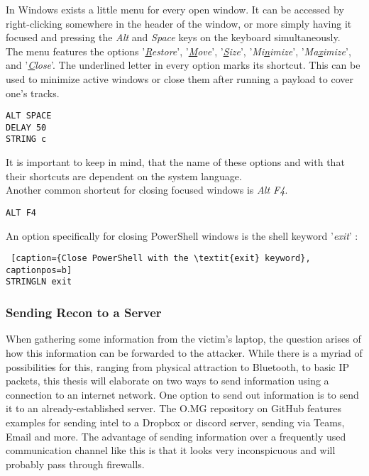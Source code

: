 In Windows exists a little menu for every open window. It can be accessed by right-clicking somewhere in the header of the window, or more simply having it focused and pressing the \textit{Alt} and \textit{Space} keys on the keyboard simultaneously. \\
The menu features the options '\textit{\underline{R}estore}', '\textit{\underline{M}ove}', '\textit{\underline{S}ize}', '\textit{Mi\underline{n}imize}', '\textit{Ma\underline{x}imize}', and '\textit{\underline{C}lose}'. The underlined letter in every option marks its shortcut. This can be used to minimize active windows or close them after running a payload to cover one's tracks.
\begin{lstlisting}[caption={Close a window through its window menu}, captionpos=b]
ALT SPACE
DELAY 50
STRING c
\end{lstlisting}
It is important to keep in mind, that the name of these options and with that their shortcuts are dependent on the system language. \\
Another common shortcut for closing focused windows is \textit{Alt F4}.
\begin{lstlisting}[caption={Close a window with ALT F4}, captionpos=b]
ALT F4
\end{lstlisting}


An option specifically for closing PowerShell windows is the shell keyword '\textit{exit}' :
\begin{lstlisting} [caption={Close PowerShell with the \textit{exit} keyword}, captionpos=b]
STRINGLN exit
\end{lstlisting}


\subsubsection{Sending Recon to a Server}

When gathering some information from the victim's laptop, the question arises of how this information can be forwarded to the attacker. While there is a myriad of possibilities for this, ranging from physical attraction to Bluetooth, to basic IP packets, this thesis will elaborate on two ways to send information using a connection to an internet network.
One option to send out information is to send it to an already-established server. The O.MG repository on GitHub features examples for sending intel to a Dropbox or discord server, sending via Teams, Email and more. The advantage of sending information over a frequently used communication channel like this is that it looks very inconspicuous and will probably pass through firewalls.\\



